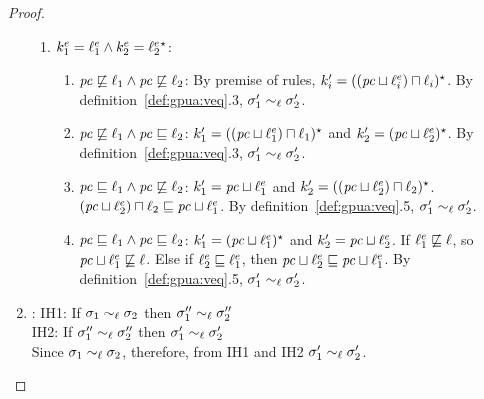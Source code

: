 \begin{proof}
\begin{enumerate}
\begin{enumerate}
       \item $k^{e}_1 = \ell^{e}_1 \wedge
          k^{e}_2 =   \ell^e_2 {}^\star  $: 
         \begin{enumerate}
            \item $\mathit{pc} \not\sqsubseteq \ell_1 \wedge \mathit{pc}
              \not\sqsubseteq \ell_2$: By premise of  rules, $k_i'
              =   ((\mathit{pc} \sqcup \ell^e_i) \sqcap \ell_i) {}^\star  $. By
              definition~\ref{def:gpua:veq}.3, $\sigma_1' \sim_\ell
              \sigma_2'$.
            \item $\mathit{pc} \not\sqsubseteq \ell_1 \wedge \mathit{pc}
              \sqsubseteq \ell_2$: $k_1' =   ((\mathit{pc} \sqcup
              \ell^e_1)\sqcap \ell_1) {}^\star 
               $ and $k_2' =   (\mathit{pc} \sqcup \ell^e_2)
              {}^\star $. By
              definition~\ref{def:gpua:veq}.3, $\sigma_1' \sim_\ell
              \sigma_2'$.
            \item $\mathit{pc} \sqsubseteq \ell_1 \wedge \mathit{pc}
              \not \sqsubseteq \ell_2$: $k_1' = \mathit{pc} \sqcup \ell^e_1$
              and $k_2' =   ((\mathit{pc} \sqcup \ell^e_2) \sqcap \ell_2) {}^\star
               $. $(\mathit{pc} \sqcup \ell^e_2) \sqcap
              \ell_2 \sqsubseteq \mathit{pc} \sqcup \ell^e_1$. By
              definition~\ref{def:gpua:veq}.5, $\sigma_1' \sim_\ell
              \sigma_2'$.
            \item $\mathit{pc} \sqsubseteq \ell_1 \wedge \mathit{pc}
              \sqsubseteq \ell_2$: $k_1' = (\mathit{pc} \sqcup
              \ell^e_1) {}^\star $ and $k_2' =  \mathit{pc} \sqcup
              \ell^e_2  $. If $\ell^e_1 \not\sqsubseteq \ell$, so $\mathit{pc}
              \sqcup \ell^e_1 \not\sqsubseteq \ell$. Else if $\ell^e_2
              \sqsubseteq \ell^e_1$, then $\mathit{pc} \sqcup \ell^e_2
              \sqsubseteq \mathit{pc} \sqcup \ell^e_1$. By
              definition~\ref{def:gpua:veq}.5, $\sigma_1' \sim_\ell
              \sigma_2'$.
          \end{enumerate}
       \end{enumerate}

 \item {}: IH1: If $\sigma_1 \sim_\ell \sigma_2$ then $\sigma_1''
   \sim_\ell \sigma_2''$ \\
   IH2: If $\sigma_1'' \sim_\ell \sigma_2''$ then $\sigma_1'
   \sim_\ell \sigma_2'$ \\
   Since $\sigma_1 \sim_\ell \sigma_2$, therefore, from IH1 and IH2 
   $\sigma_1' \sim_\ell \sigma_2'$.


\end{enumerate}
\end{proof}

